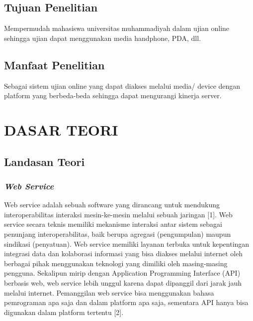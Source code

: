 \documentclass{jtetiproposalskripsi}
\begin{document}
\section{Tujuan Penelitian}
Mempermudah mahasiswa universitas muhammadiyah dalam ujian online sehingga ujian dapat menggunakan media handphone, PDA, dll.

\section{Manfaat Penelitian}
Sebagai sistem ujian online yang dapat diakses melalui media/ device dengan platform yang berbeda-beda sehingga dapat mengurangi kinerja server.

\chapter{DASAR TEORI}                
\section{Landasan Teori}
\subsection{\emph{Web Service}}
Web service adalah sebuah software  yang dirancang untuk mendukung interoperabilitas interaksi mesin-ke-mesin melalui sebuah jaringan [1].  Web service  secara teknis memiliki mekanisme interaksi antar sistem sebagai penunjang interoperabilitas, baik berupa agregasi (pengumpulan) maupun sindikasi (penyatuan).  Web service  memiliki layanan terbuka untuk kepentingan integrasi data dan kolaborasi informasi yang bisa diakses melalui internet oleh berbagai pihak menggunakan teknologi yang dimiliki oleh masing-masing pengguna. Sekalipun mirip dengan Application Programming Interface  (API) berbasis web,  web service lebih unggul karena dapat dipanggil dari jarak jauh melalui internet. Pemanggilan web service  bisa menggunakan bahasa pemrograman apa saja dan dalam  platform apa saja, sementara API hanya bisa digunakan dalam  platform tertentu  [2].  
\end{document}
